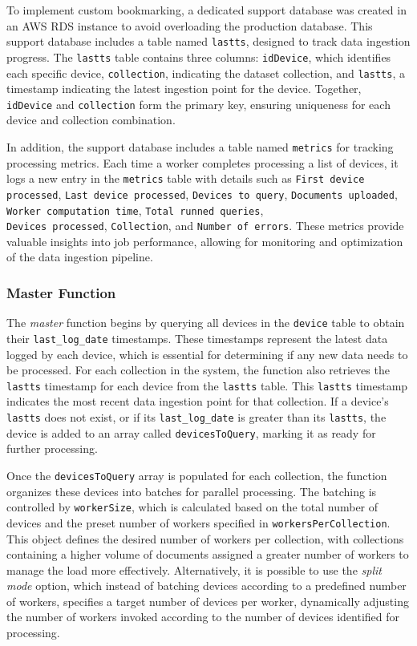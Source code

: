 To implement custom bookmarking, a dedicated support database was created in an \ac{AWS} \ac{RDS} instance to avoid overloading the production database. This support database includes a table named \texttt{lastts}, designed to track data ingestion progress. The \texttt{lastts} table contains three columns: \texttt{idDevice}, which identifies each specific device, \texttt{collection}, indicating the dataset collection, and \texttt{lastts}, a timestamp indicating the latest ingestion point for the device. Together, \texttt{idDevice} and \texttt{collection} form the primary key, ensuring uniqueness for each device and collection combination.

In addition, the support database includes a table named \texttt{metrics} for tracking processing metrics. Each time a worker completes processing a list of devices, it logs a new entry in the \texttt{metrics} table with details such as \texttt{First device processed}, \texttt{Last device processed}, \texttt{Devices to query}, \texttt{Documents uploaded}, \texttt{Worker computation time}, \texttt{Total runned queries}, \\\texttt{Devices processed}, \texttt{Collection}, and \texttt{Number of errors}. These metrics provide valuable insights into job performance, allowing for monitoring and optimization of the data ingestion pipeline.

\subsubsection{Master Function}

The \textit{master} function begins by querying all devices in the \texttt{device} table to obtain their \texttt{last\_log\_date} timestamps. These timestamps represent the latest data logged by each device, which is essential for determining if any new data needs to be processed. For each collection in the system, the function also retrieves the \texttt{lastts} timestamp for each device from the \texttt{lastts} table. This \texttt{lastts} timestamp indicates the most recent data ingestion point for that collection. If a device's \texttt{lastts} does not exist, or if its \texttt{last\_log\_date} is greater than its \texttt{lastts}, the device is added to an array called \texttt{devicesToQuery}, marking it as ready for further processing.

Once the \texttt{devicesToQuery} array is populated for each collection, the function organizes these devices into batches for parallel processing. The batching is controlled by \texttt{workerSize}, which is calculated based on the total number of devices and the preset number of workers specified in \texttt{workersPerCollection}. This object defines the desired number of workers per collection, with collections containing a higher volume of documents assigned a greater number of workers to manage the load more effectively. Alternatively, it is possible to use the \textit{split mode} option, which instead of batching devices according to a predefined number of workers, specifies a target number of devices per worker, dynamically adjusting the number of workers invoked according to the number of devices identified for processing.

